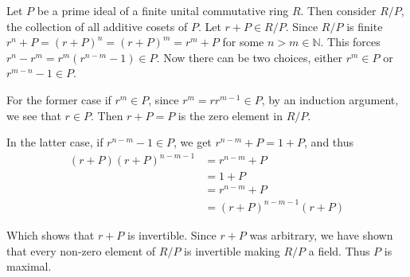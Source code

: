 \documentclass[12pt]{exam}
\theoremstyle{plain} %
\theoremstyle{definition} %
\theoremstyle{remark} %
\begin{document}
\begin{questions}
  \question
  \begin{solution}
    Let $P$ be a prime ideal of a finite unital commutative ring $R$.
    Then consider $R/P$, the collection of all additive cosets of
    $P$. Let $r + P \in R/P$. Since $R/P$ is finite $r^n + P = (r +
    P)^n = (r + P)^m =  r^m + P$ for some $n > m \in \mathbb{N}$.
    This forces $r^n - r^m = r^m(r^{n-m} - 1) \in P$. Now there can
    be two choices, either $r^m \in P$ or $r^{m-n} -1 \in P$.

    For the former case if $r^m \in P$, since $r^m = rr^{m-1} \in P$,
    by an induction argument, we see that $r \in P$. Then $r + P = P$
    is the zero element in $R/P$.

    In the latter case, if $r^{n-m} - 1 \in P$, we get $r^{n-m} + P =
    1 + P$, and thus
    \begin{align*}
      (r + P)(r + P)^{n - m - 1} &= r^{n - m} + P \\
      &= 1 + P \\
      &= r^{n - m} + P \\
      &= (r + P)^{n - m - 1}(r + P)
    \end{align*}
  \end{solution}
  Which shows that $r + P$ is invertible. Since $r + P$ was
  arbitrary, we have shown that every non-zero element of $R/P$ is
  invertible making $R/P$ a field. Thus $P$ is maximal.
\end{questions}
\printbibliography[heading=bibintoc]
\end{document}
